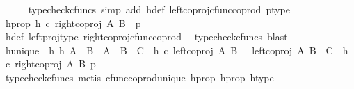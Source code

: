 \begin{isabellebody}
\ \ \ \ \isamarkupfalse%
\ {\isacharparenleft}{\kern0pt}typecheck{\isacharunderscore}{\kern0pt}cfuncs{\isacharcomma}{\kern0pt}\ simp\ add{\isacharcolon}{\kern0pt}\ h{\isacharunderscore}{\kern0pt}def\ left{\isacharunderscore}{\kern0pt}coproj{\isacharunderscore}{\kern0pt}cfunc{\isacharunderscore}{\kern0pt}coprod\ p{\isacharunderscore}{\kern0pt}type{\isacharparenright}{\kern0pt}\isanewline
\ \ \isamarkupfalse%
\ h{\isacharunderscore}{\kern0pt}prop{}{\isacharcolon}{\kern0pt}\ {\isachardoublequoteopen}h\ {\isasymcirc}\isactrlsub c\ {\isacharparenleft}{\kern0pt}right{\isacharunderscore}{\kern0pt}coproj\ A\ B{\isacharparenright}{\kern0pt}\ {\isacharequal}{\kern0pt}\ p{\isachardoublequoteclose}\isanewline
\ \ \ \ \isamarkupfalse%
\ h{\isacharunderscore}{\kern0pt}def\ left{\isacharunderscore}{\kern0pt}proj{\isacharunderscore}{\kern0pt}type\ right{\isacharunderscore}{\kern0pt}coproj{\isacharunderscore}{\kern0pt}cfunc{\isacharunderscore}{\kern0pt}coprod\ \isamarkupfalse%
\ {\isacharparenleft}{\kern0pt}typecheck{\isacharunderscore}{\kern0pt}cfuncs{\isacharcomma}{\kern0pt}\ blast{\isacharparenright}{\kern0pt}\isanewline
\ \ \isamarkupfalse%
\ h{\isacharunderscore}{\kern0pt}unique{\isacharcolon}{\kern0pt}\ {\isachardoublequoteopen}{\isasymexists}{\isacharbang}{\kern0pt}\ h{\isachardot}{\kern0pt}\ {\isacharparenleft}{\kern0pt}{\isacharparenleft}{\kern0pt}h{\isacharcolon}{\kern0pt}\ {\isacharparenleft}{\kern0pt}A\ {\isasymCoprod}\ B{\isacharparenright}{\kern0pt}\ {\isasymrightarrow}\ A\ {\isasymCoprod}\ {\isacharparenleft}{\kern0pt}B\ {\isasymCoprod}\ C{\isacharparenright}{\kern0pt}{\isacharparenright}{\kern0pt}\ {\isasymand}\ {\isacharparenleft}{\kern0pt}h\ {\isasymcirc}\isactrlsub c\ {\isacharparenleft}{\kern0pt}left{\isacharunderscore}{\kern0pt}coproj\ A\ B{\isacharparenright}{\kern0pt}\ \ {\isacharequal}{\kern0pt}\ {\isacharparenleft}{\kern0pt}left{\isacharunderscore}{\kern0pt}coproj\ A\ {\isacharparenleft}{\kern0pt}B\ {\isasymCoprod}\ C{\isacharparenright}{\kern0pt}{\isacharparenright}{\kern0pt}{\isacharparenright}{\kern0pt}\ {\isasymand}\ {\isacharparenleft}{\kern0pt}h\ {\isasymcirc}\isactrlsub c\ {\isacharparenleft}{\kern0pt}right{\isacharunderscore}{\kern0pt}coproj\ A\ B{\isacharparenright}{\kern0pt}\ {\isacharequal}{\kern0pt}p{\isacharparenright}{\kern0pt}{\isacharparenright}{\kern0pt}{\isachardoublequoteclose}\isanewline
\ \ \ \ \isamarkupfalse%
\ {\isacharparenleft}{\kern0pt}typecheck{\isacharunderscore}{\kern0pt}cfuncs{\isacharcomma}{\kern0pt}\ metis\ cfunc{\isacharunderscore}{\kern0pt}coprod{\isacharunderscore}{\kern0pt}unique\ h{\isacharunderscore}{\kern0pt}prop{}\ h{\isacharunderscore}{\kern0pt}prop{}\ h{\isacharunderscore}{\kern0pt}type{\isacharparenright}{\kern0pt}\isanewline

\end{isabellebody}
